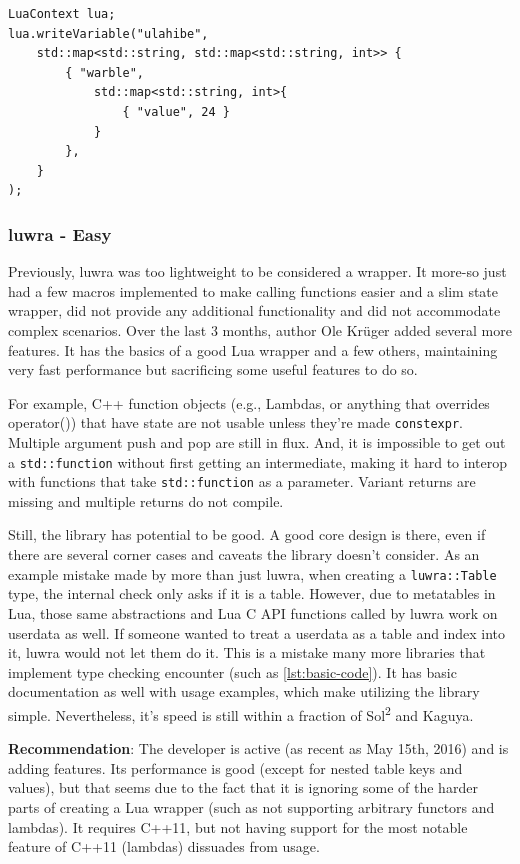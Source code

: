 \documentclass[conference,compsoc]{IEEEtran}
\newcommand{\soltwo}{Sol\textsuperscript{2}}
\begin{document}
\begin{lstlisting}[caption={luawrapper code to write a nested table. It is not the prettiest.},
label={lst:luawrapper-code}]
LuaContext lua;
lua.writeVariable("ulahibe", 
	std::map<std::string, std::map<std::string, int>> {
		{ "warble", 
			std::map<std::string, int>{ 
				{ "value", 24 }
			} 
		},
	}
);
\end{lstlisting}

\subsubsection{luwra - Easy}\label{sssec:luwra}

Previously, luwra\cite{luwra} was too lightweight to be considered a wrapper. It more-so just had a few macros implemented to make calling functions easier and a slim state wrapper, did not provide any additional functionality and did not accommodate complex scenarios. Over the last 3 months, author Ole Krüger added several more features. It has the basics of a good Lua wrapper and a few others, maintaining very fast performance but sacrificing some useful features to do so.

For example, C++ function objects (e.g., Lambdas, or anything that overrides operator()) that have state are not usable unless they're made \lstinline|constexpr|. Multiple argument push and pop are still in flux. And, it is impossible to get out a \lstinline|std::function| without first getting an intermediate, making it hard to interop with functions that take \lstinline|std::function| as a parameter. Variant returns are missing and multiple returns do not compile.

Still, the library has potential to be good. A good core design is there, even if there are several corner cases and caveats the library doesn't consider. As an example mistake made by more than just luwra, when creating a \lstinline|luwra::Table| type, the internal check only asks if it is a table. However, due to metatables in Lua, those same abstractions and Lua C API functions called by luwra work on userdata as well. If someone wanted to treat a userdata as a table and index into it, luwra would not let them do it. This is a mistake many more libraries that implement type checking encounter (such as \cref{lst:basic-code}). It has basic documentation as well with usage examples, which make utilizing the library simple. Nevertheless, it's speed is still within a fraction of \soltwo{} and Kaguya. 

\textbf{Recommendation}: The developer is active (as recent as May 15th, 2016) and is adding features. Its performance is good (except for nested table keys and values), but that seems due to the fact that it is ignoring some of the harder parts of creating a Lua wrapper (such as not supporting arbitrary functors and lambdas). It requires C++11, but not having support for the most notable feature of C++11 (lambdas) dissuades from usage.
\end{document}
